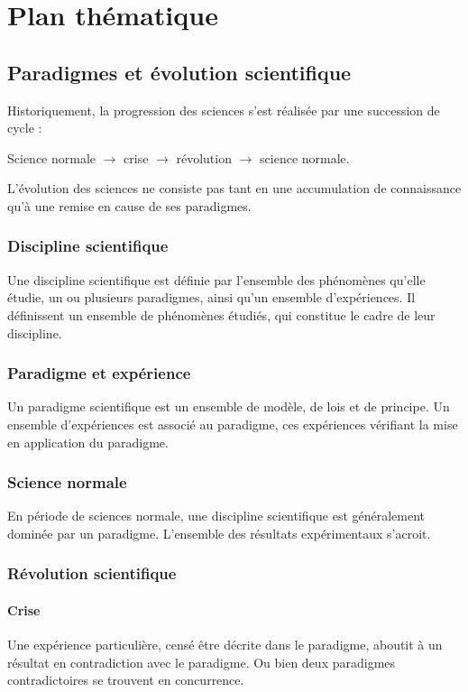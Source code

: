 \chapter{Plan thématique}

\section{Paradigmes et évolution scientifique}

Historiquement, la progression des sciences s'est réalisée par une succession de cycle :
\begin{center}
Science normale $\to$ crise $\to$ révolution $\to$ science normale.
\end{center}
L'évolution des sciences ne consiste pas tant en une accumulation de connaissance qu'à une remise en cause de ses paradigmes.

  \subsection{Discipline scientifique}
Une discipline scientifique est définie par l'ensemble des phénomènes qu'elle étudie, un ou plusieurs paradigmes, ainsi qu'un ensemble d'expériences.
 Il définissent un ensemble de phénomènes étudiés, qui constitue le cadre de leur discipline.
  \subsection{Paradigme et expérience}
Un paradigme scientifique est un ensemble de modèle, de lois et de principe. Un ensemble d'expériences est associé au paradigme, ces expériences vérifiant la mise en application du paradigme.
  \subsection{Science normale}
En période de sciences normale, une discipline scientifique est généralement dominée par un paradigme. L'ensemble des résultats expérimentaux s'acroit.
  \subsection{Révolution scientifique}
    \subsubsection{Crise}
Une expérience particulière, censé être décrite dans le paradigme, aboutit à un résultat en contradiction avec le paradigme.
Ou bien deux paradigmes contradictoires se trouvent en concurrence.
